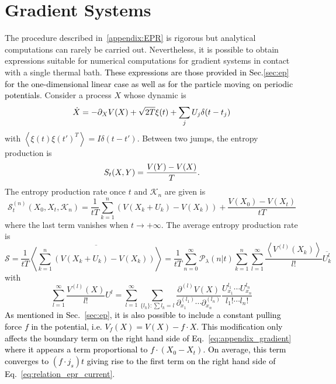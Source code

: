 \documentclass[12pt]{iopart}
\newcommand{\lx} {\left}
\newcommand{\rx} {\right}
\newcommand{\ave}[1] {\lx\langle #1 \rx\rangle}
\newcommand{\cP} {\mathcal{P}}
\newcommand{\cS} {\mathcal{S}}
\newcommand{\cK} {\mathcal{K}}
\begin{document}
\section{Gradient Systems}\label{app:Gradient-Systems}%
The procedure described in~\ref{appendix:EPR} is rigorous but analytical computations can rarely be carried out. Nevertheless, it is possible to obtain expressions suitable for numerical computations for gradient systems in contact with a single thermal bath. \textcolor{black}{These expressions are those provided in Sec.\ref{sec:ep} for the one-dimensional linear case as well as for the particle moving on periodic potentials}. Consider a process $X$ whose dynamic is 
\begin{equation}
    \dot{X} = -\partial_X V(X) + \sqrt{2T}\xi(t) +\sum_j U_j \delta(t-t_j)\\
\end{equation}
with $\ave{\xi(t)\xi(t')^T}=I\delta(t-t')$. Between two jumps, the entropy production is 
\begin{equation}
    S_t(X,Y) = \frac{V(Y) -V(X)}{T}.\\
\end{equation}
The entropy production rate once $t$ and $\cK_n$ are given is 
\begin{equation}
\cS^{(n)}_t(X_0,X_t,\cK_n)=  \frac{1}{tT}\sum_{k=1}^n \lx(V(X_k+U_k)-V(X_k)\rx)+\frac{V(X_0) -V(X_t)}{tT}
\label{eq:appendix_gradient}
\end{equation}
where the last term vanishes when $t\to+\infty$.
The average entropy production rate is
\begin{equation}
\cS = \frac{1}{tT}\overline{\ave{\sum_{k=1}^n \lx(V(X_k+U_k)-V(X_k)\rx)}} = \frac{1}{tT} \sum_{n=0}^\infty \cP_\lambda(n|t) \sum_{k=1}^n \sum_{l=1}^\infty \frac{\ave{V^{(l)}(X_k)}}{l!}\overline{U_k^{l}}
\end{equation}
with
\begin{equation}
\sum_{l=1}^\infty \frac{V^{(l)}(X)}{l!}U^{l}=\sum_{l=1}^{\infty}\sum_{\{l_k\}:\sum l_k =l}\frac{\partial^{(l)}V(X)}{\partial_{x_1}^{(l_1)}\cdots\partial_{x_n}^{(l_n)}}\frac{U_{x_1}^{l_1}\cdots U_{x_n}^{l_n}}{l_1!\cdots l_n!}
\end{equation}
\textcolor{black}{As mentioned in Sec.~\ref{sec:ep}, it is also possible to include a constant pulling force $f$ in the potential, i.e. $V_f(X)=V(X)-f\cdot X$. This modification only affects the boundary term on the right hand side of Eq.~\ref{eq:appendix_gradient} where it appears a term proportional to $f\cdot (X_0-X_t)$. On average, this term converges to $(f\cdot j_s) t$ giving rise to the first term on the right hand side of Eq.~\ref{eq:relation_epr_current}.}
\end{document}

